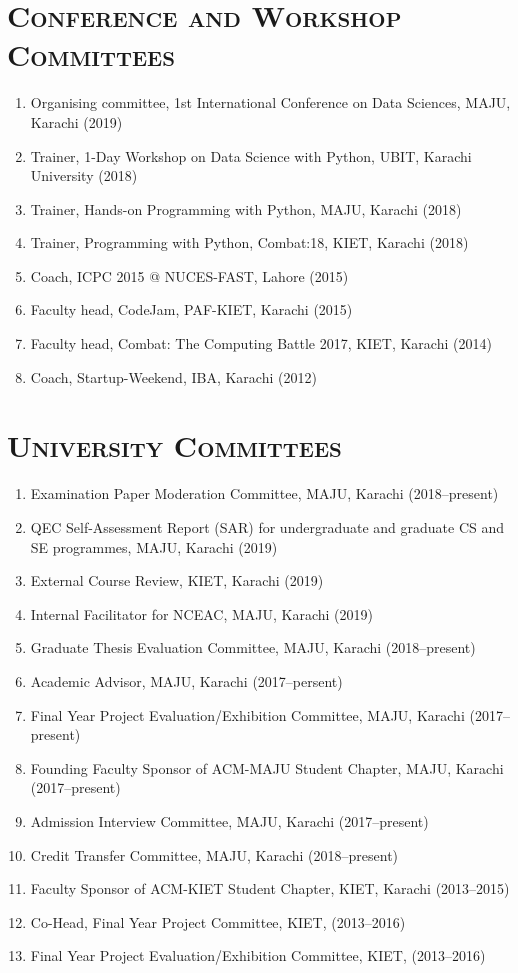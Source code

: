 \documentclass[a4paper, 10pt]{article}
\begin{document}
\section*{\normalfont\textsc{Conference and Workshop Committees}}
\begin{enumerate}
\itemsep-4pt
\item Organising committee, 1st International Conference on Data Sciences, MAJU, Karachi (2019)
\item Trainer, 1-Day Workshop on Data Science with Python, UBIT, Karachi University (2018)
\item  Trainer, Hands-on Programming with Python, MAJU, Karachi (2018)
\item  Trainer, Programming with Python, Combat:18, KIET, Karachi (2018)
\item  Coach, ICPC 2015 @ NUCES-FAST, Lahore (2015)
\item  Faculty head, CodeJam, PAF-KIET, Karachi (2015)
\item  Faculty head, Combat: The Computing Battle 2017, KIET, Karachi (2014)
\item  Coach, Startup-Weekend, IBA, Karachi (2012)
\end{enumerate}

\section*{\normalfont\textsc{University Committees}}
\begin{enumerate}
\itemsep-4pt 
\item Examination Paper Moderation Committee, MAJU, Karachi (2018--present)
\item QEC Self-Assessment Report (SAR) for undergraduate and graduate CS and SE programmes, MAJU, Karachi (2019)
\item External Course Review, KIET, Karachi (2019)
\item Internal Facilitator for NCEAC, MAJU, Karachi (2019)
\item Graduate Thesis Evaluation Committee, MAJU, Karachi (2018--present)
\item Academic Advisor, MAJU, Karachi (2017--persent)
\item Final Year Project Evaluation/Exhibition Committee, MAJU, Karachi (2017--present)
\item Founding Faculty Sponsor of ACM-MAJU Student Chapter, MAJU, Karachi (2017--present)
\item Admission Interview Committee, MAJU, Karachi (2017--present)
\item Credit Transfer Committee, MAJU, Karachi (2018--present)
\item Faculty Sponsor of ACM-KIET Student Chapter, KIET, Karachi (2013--2015)
\item Co-Head, Final Year Project Committee, KIET, (2013--2016)
\item Final Year Project Evaluation/Exhibition Committee, KIET, (2013--2016)
\end{enumerate}
\end{document}
